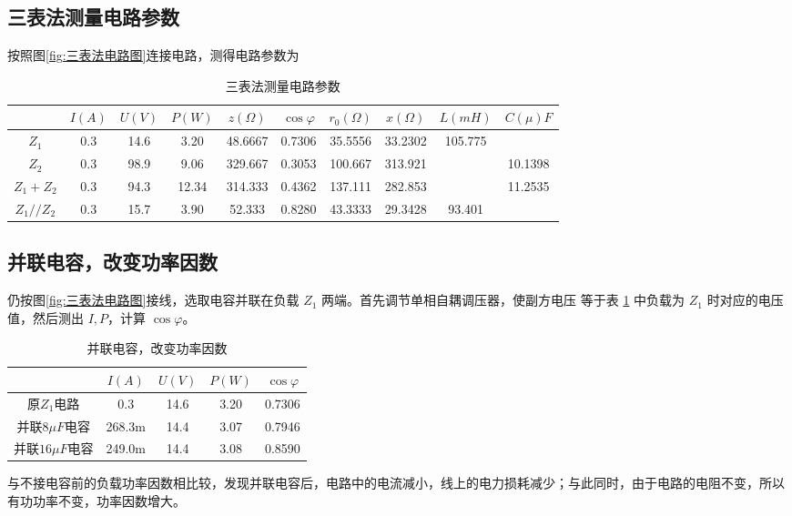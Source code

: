 \documentclass{ctexart}
\begin{document}
\subsection{三表法测量电路参数}
按照图\ref{fig:三表法电路图}连接电路，测得电路参数为
\begin{table}[!ht]
    \centering
    \begin{tabular}{|c|c|c|c|c|c|c|c|c|c|}
    \hline
      ~& $I(A)$& $U(V)$ & $P(W)$ &$z(\Omega)$& $\cos \varphi$ & $r_0(\Omega)$&$x(\Omega)$&$L(mH)$ &$C(\mu)F$ \\ \hline    $Z_1$&0.3&14.6&3.20&48.6667&0.7306&35.5556&33.2302&105.775&~\\\hline   $Z_2$&0.3&98.9&9.06&329.667&0.3053&100.667&313.921&~&10.1398 \\    \hline$Z_1+Z_2$&0.3&94.3&12.34&314.333&0.4362&137.111&282.853&~&11.2535\\ \hline     $Z_1//Z_2$&0.3&15.7&3.90&52.333&0.8280&43.3333&29.3428&93.401&~\\ \hline
    \end{tabular}
    \caption{三表法测量电路参数}
    \label{tab:三表法测量电路参数}
\end{table}
\subsection{并联电容，改变功率因数}
仍按图\ref{fig:三表法电路图}接线，选取电容并联在负载 $Z_1$ 两端。首先调节单相自耦调压器，使副方电压
等于表 \ref{tab:三表法测量电路参数} 中负载为 $Z_1$ 时对应的电压值，然后测出 $I,P$，计算 $\cos \varphi$。
\begin{table}[!ht]
    \centering
    \begin{tabular}{|c|c|c|c|c|}
    \hline
        ~& $I(A)$ & $U(V)$ &$P(W)$ &$\cos\varphi$  \\ \hline
        原$Z_1$电路&0.3&14.6&3.20&0.7306\\ \hline 
        并联$8\mu F$电容 & 268.3m&14.4&3.07&0.7946\\\hline
        并联$16\mu F$电容 & 249.0m&14.4&3.08&0.8590\\\hline
    \end{tabular}
    \caption{并联电容，改变功率因数}
    \label{tab:并联电容，改变功率因数}
\end{table}
与不接电容前的负载功率因数相比较，发现并联电容后，电路中的电流减小，线上的电力损耗减少；与此同时，由于电路的电阻不变，所以有功功率不变，功率因数增大。
\end{document}
